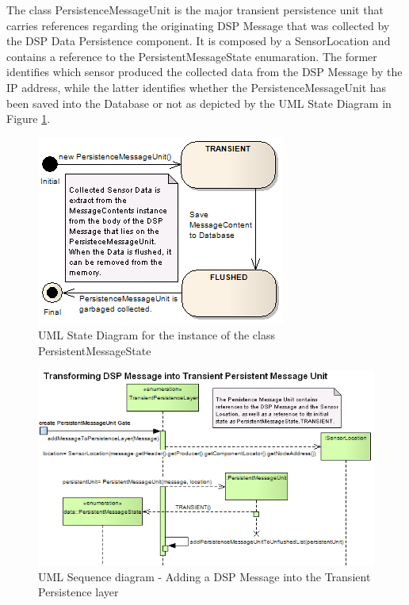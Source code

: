 The class PersistenceMessageUnit is the major transient persistence unit that
carries references regarding the originating DSP Message that was collected by
the DSP Data Persistence component. It is composed by a SensorLocation and
contains a reference to the PersistentMessageState enumaration. The former
identifies which sensor produced the collected data from the DSP Message by the
IP address, while the latter identifies whether the PersistenceMessageUnit has
been saved into the Database or not as depicted by the UML State Diagram
\cite{uml} in Figure \ref{fig:PersistentMessageState-Diagram}.

\begin{figure}[!b]
  \centering
  \includegraphics[scale=0.5]{../diagrams/PersistentMessageState-Diagram}
  \caption{UML State Diagram for the instance of the class
  PersistentMessageState}
  \label{fig:PersistentMessageState-Diagram}
\end{figure}

\begin{figure}[!b]
  \centering
  \includegraphics[scale=0.5]{../diagrams/From-Create-PersistentMessageUnit-to-TransientPersistence-Layer-Sequence}
  \caption{UML Sequence diagram - Adding a DSP Message into the Transient Persistence layer}
  \label{fig:From-Create-PersistentMessageUnit-to-TransientPersistence-Layer-Sequence}
\end{figure}

